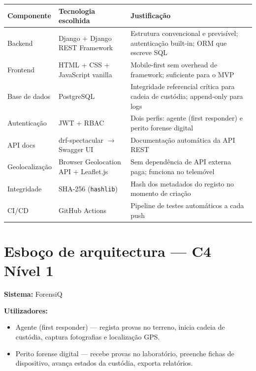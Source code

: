 \documentclass[a4paper,11pt]{article}
\begin{document}
\begin{longtable}{L{3cm} L{5cm} L{6.5cm}}
    \toprule
    \textbf{Componente} & \textbf{Tecnologia escolhida} & \textbf{Justificação} \\
    \midrule
    \endhead
    Backend
        & Django + Django REST Framework
        & Estrutura convencional e previsível; autenticação built-in; ORM que escreve SQL \\[0.4em]
    Frontend
        & HTML + CSS + JavaScript vanilla
        & Mobile-first sem overhead de framework; suficiente para o MVP \\[0.4em]
    Base de dados
        & PostgreSQL
        & Integridade referencial crítica para cadeia de custódia; append-only para logs \\[0.4em]
    Autenticação
        & JWT + RBAC
        & Dois perfis: agente (first responder) e perito forense digital \\[0.4em]
    API docs
        & drf-spectacular $\rightarrow$ Swagger UI
        & Documentação automática da API REST \\[0.4em]
    Geolocalização
        & Browser Geolocation API + Leaflet.js
        & Sem dependência de API externa paga; funciona no telemóvel \\[0.4em]
    Integridade
        & SHA-256 (\texttt{hashlib})
        & Hash dos metadados do registo no momento de criação \\[0.4em]
    CI/CD
        & GitHub Actions
        & Pipeline de testes automáticos a cada push \\
    \bottomrule
\end{longtable}

\section{Esboço de arquitectura --- C4 Nível 1}

\textbf{Sistema:} ForensiQ

\textbf{Utilizadores:}
\begin{itemize}[nosep]
    \item Agente (first responder) --- regista provas no terreno, inicia cadeia de
    custódia, captura fotografias e localização GPS.
    \item Perito forense digital --- recebe provas no laboratório, preenche fichas
    de dispositivo, avança estados da custódia, exporta relatórios.
\end{itemize}
\end{document}
